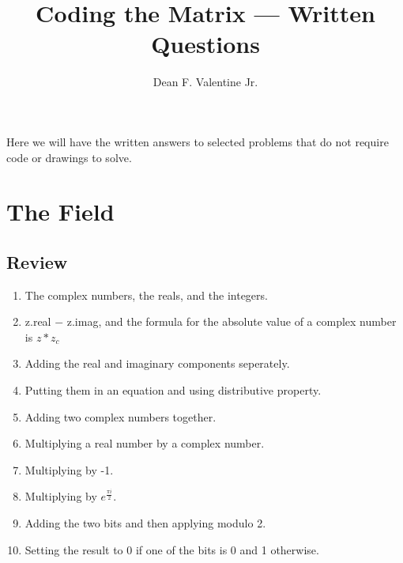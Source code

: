 \documentclass{article}
\title{Coding the Matrix --- Written Questions}
\author{Dean F. Valentine Jr.}
\begin{document}
    \maketitle
    Here we will have the written answers to selected problems that do not
    require code or drawings to solve.
    \section{The Field}
    \addtocounter{subsection}{5}
    \subsection{Review}
    \begin{enumerate}
        \item The complex numbers, the reals, and the integers.
        \item z.real $-$ z.imag, and the formula for the absolute value of a complex number is $z * z_{c}$
        \item Adding the real and imaginary components seperately.
        \item Putting them in an equation and using distributive property.
        \item Adding two complex numbers together.
        \item Multiplying a real number by a complex number.
        \item Multiplying by -1.
        \item Multiplying by $e^{\frac{{\pi}i}{2}}$.
        \item Adding the two bits and then applying modulo 2.
        \item Setting the result to 0 if one of the bits is 0 and 1 otherwise.
    \end{enumerate}
\end{document}
